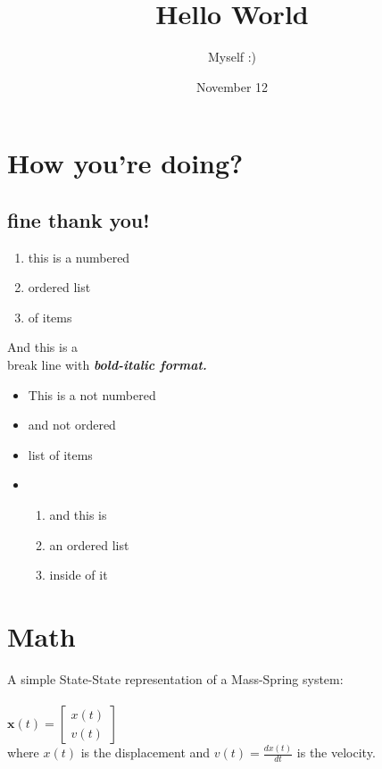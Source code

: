 \documentclass{article}
\author{Myself :)}
\date{November 12}
\title{Hello World}
\begin{document}
    \maketitle 
    \newpage
    \section{How you're doing?}
    \subsection{fine thank you!}
    \begin{enumerate}
        \item this is a numbered
        \item ordered list
        \item of items
    \end{enumerate}
    And this is a \\ break line with \textbf{\textit{bold-italic format.}}
    \begin{itemize}
        \item This is a not numbered
        \item and not ordered
        \item list of items
        \item \begin{enumerate}
            \item and this is
            \item an ordered list
            \item inside of it
        \end{enumerate}
    \end{itemize}
    \section{Math}

    A simple State-State representation of a Mass-Spring system:\\ \\
    
    \begin{math}
        \mathbf{x}(t) = \begin{bmatrix} x(t) \\ v(t) \end{bmatrix}
    \end{math}
    \\
    where \( x(t) \) is the displacement and \( v(t) = \frac{dx(t)}{dt} \) is the velocity.\\
\end{document}
